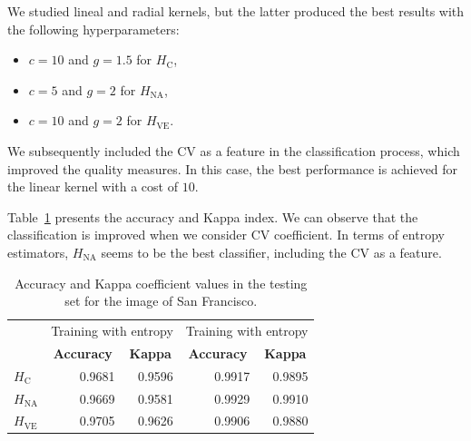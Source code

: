 \documentclass[journal]{IEEEtran}
\begin{document}


We studied lineal and radial kernels, but the latter produced the best results with the following hyperparameters:
\begin{itemize}
	\item $c=10$ and $g=1.5$ for $H_\text{C}$,
	\item $c=5$ and $g=2$ for $H_{\text{NA}}$,
	\item $c=10$ and $g=2$ for $H_{\text{VE}}$.
\end{itemize}

We subsequently included the CV as a feature in the classification process, which improved the quality measures. In this case, the best performance is achieved for the linear kernel with a cost of $10$.

Table~\ref{tab:acc_SF} presents the accuracy and Kappa index. 
We can observe that the classification is improved when we consider CV coefficient. In terms of entropy estimators, $H_{\text{NA}}$ seems to be the best classifier, including the CV as a feature.

\begin{table}[htbp]
	\centering
	\caption{Accuracy and Kappa coefficient values in the testing set for the image of San Francisco.}
	\begin{tabular}{lrrrr}
		\toprule
		& \multicolumn{2}{c}{\multirow{2}[-2]{*}{Training with entropy}} & \multicolumn{2}{c}{\multirow{2}[-2]{*}{Training with entropy}} \\
		& \multicolumn{2}{c}{estimators} & \multicolumn{2}{c}{estimators and cv} \\ \cmidrule(lr){2-3}\cmidrule(lr){4-5}          
		& \multicolumn{1}{c}{\textbf{Accuracy}} & \multicolumn{1}{c}{\textbf{Kappa}} & \multicolumn{1}{c}{\textbf{Accuracy}} & \multicolumn{1}{c}{\textbf{Kappa}} \\
		\cmidrule(lr){2-2}\cmidrule(lr){3-3}\cmidrule(lr){4-4}\cmidrule(lr){5-5}
		$H_\text{C}$    & 0.9681 & 0.9596 & 0.9917 & 0.9895 \\
		$H_{\text{NA}}$   & 0.9669 & 0.9581 & 0.9929 & 0.9910 \\
		$H_{\text{VE}}$   & 0.9705 & 0.9626 & 0.9906 & 0.9880 \\
		\bottomrule
	\end{tabular}%
	\label{tab:acc_SF}%
\end{table}%
\end{document}
